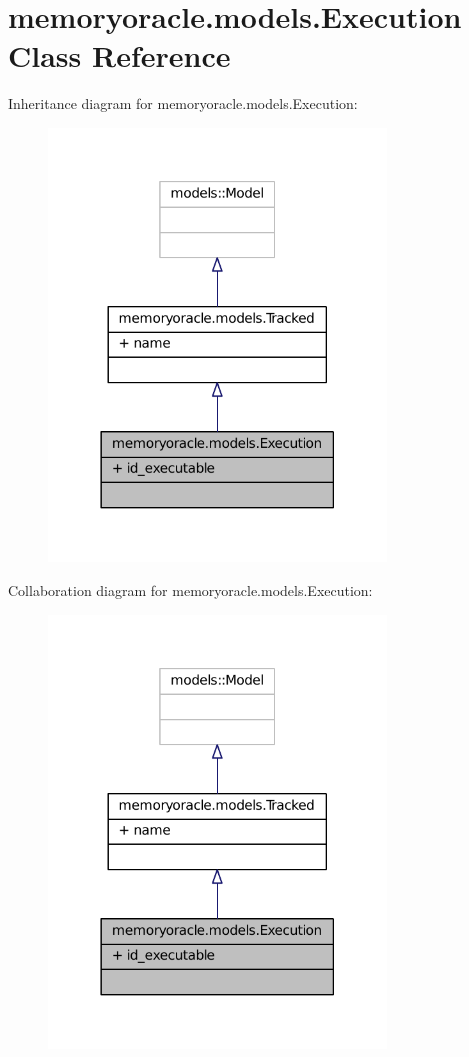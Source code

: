 \hypertarget{classmemoryoracle_1_1models_1_1Execution}{}\section{memoryoracle.\+models.\+Execution Class Reference}
\label{classmemoryoracle_1_1models_1_1Execution}


Inheritance diagram for memoryoracle.\+models.\+Execution\+:\nopagebreak
\begin{figure}[H]
\begin{center}
\leavevmode
\includegraphics[width=254pt]{classmemoryoracle_1_1models_1_1Execution__inherit__graph}
\end{center}
\end{figure}


Collaboration diagram for memoryoracle.\+models.\+Execution\+:\nopagebreak
\begin{figure}[H]
\begin{center}
\leavevmode
\includegraphics[width=254pt]{classmemoryoracle_1_1models_1_1Execution__coll__graph}
\end{center}
\end{figure}
